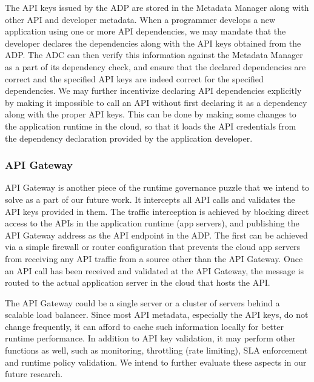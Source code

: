 The API keys issued by the ADP are stored in the Metadata Manager along with other API and developer metadata. When a programmer develops a new application
using one or more API dependencies, we may mandate that the developer declares the dependencies along with the API keys obtained from the ADP. The ADC
can then verify this information against the Metadata Manager as a part of its dependency check, and ensure that the declared dependencies are correct and 
the specified API keys are indeed correct for the specified dependencies. We may further incentivize declaring API dependencies explicitly by making it 
impossible to call an API without first declaring it as a dependency along with the proper API keys. This can be done by making some changes to the application
runtime in the cloud, so that it loads the API credentials from the dependency declaration provided by the application developer.

\subsubsection{API Gateway}
API Gateway is another piece of the runtime governance puzzle that we intend to solve as a part of our future work. It intercepts all API calls and validates the API
keys provided in them. The traffic interception is achieved by blocking direct access to the APIs in the application runtime (app servers), and publishing the API 
Gateway address as the API endpoint in the ADP. The first can be achieved via a simple firewall or router configuration that prevents the cloud app servers from 
receiving any API traffic from a source other than the API Gateway. Once an API call has been received and validated at the API Gateway, the message is
routed to the actual application server in the cloud that hosts the API.

The API Gateway could be a single server or a cluster of servers behind a scalable load balancer. Since most API metadata, especially the API keys, do not change
frequently, it can afford to cache such information locally for better runtime performance. In addition to API key validation, it may perform other
functions as well, such as monitoring, throttling (rate limiting), SLA enforcement and runtime policy validation. We intend to further evaluate these aspects
in our future research.